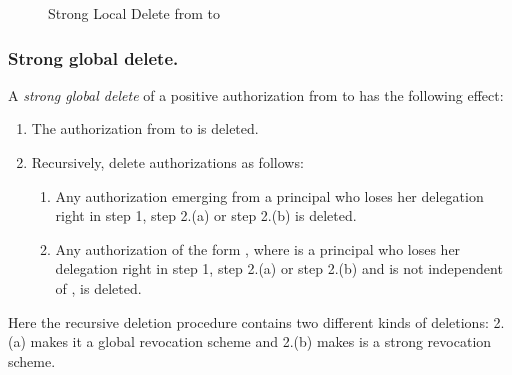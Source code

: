 \documentclass[runningheads]{llncs}
\begin{document}
\vspace{-3mm}
\begin{figure}[H]
\center
{}
\vspace{-1mm}
\caption{Strong Local Delete from  to }
\end{figure}
\vspace{-7mm}

\subsubsection{Strong global delete.}
A \emph{strong global delete} of a positive authorization from  to  has the following effect:
\vspace{-1mm}
\begin{enumerate}
 \item The authorization from  to  is deleted.
 \item Recursively, delete authorizations as follows:
 \begin{enumerate}
  \item Any authorization emerging from a principal who loses her delegation right in step 1, step 2.(a) or step 2.(b) is deleted.
  \item Any authorization of the form , where  is a principal who loses her delegation right in step 1, step 2.(a) or step 2.(b) and  is not independent of , is deleted.
 \end{enumerate}
\end{enumerate}
\vspace{-1mm}
Here the recursive deletion procedure contains two different kinds of deletions: 2.(a) makes it a global revocation scheme and 2.(b) makes is a strong revocation scheme.
\end{document}
